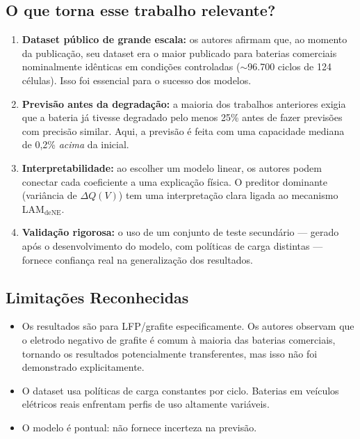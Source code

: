 \documentclass[12pt,a4paper]{article}
\begin{document}
\subsection{O que torna esse trabalho relevante?}

\begin{enumerate}
  \item \textbf{Dataset p\'{u}blico de grande escala:} os autores afirmam que,
    ao momento da publica\c{c}\~ao, seu dataset era o maior publicado para baterias
    comerciais nominalmente id\^{e}nticas em condi\c{c}\~oes controladas ($\sim$96.700
    ciclos de 124 c\'{e}lulas). Isso foi essencial para o sucesso dos modelos.

  \item \textbf{Previs\~ao antes da degrada\c{c}\~ao:} a maioria dos trabalhos anteriores
    exigia que a bateria j\'{a} tivesse degradado pelo menos 25\% antes de fazer
    previs\~oes com precis\~ao similar. Aqui, a previs\~ao \'{e} feita com uma
    capacidade mediana de 0,2\% \textit{acima} da inicial.

  \item \textbf{Interpretabilidade:} ao escolher um modelo linear, os autores
    podem conectar cada coeficiente a uma explica\c{c}\~ao f\'{i}sica. O preditor
    dominante (vari\^{a}ncia de $\Delta Q(V)$) tem uma interpreta\c{c}\~ao clara
    ligada ao mecanismo LAM$_\text{deNE}$.

  \item \textbf{Valida\c{c}\~ao rigorosa:} o uso de um conjunto de teste secund\'{a}rio
    --- gerado ap\'{o}s o desenvolvimento do modelo, com pol\'{i}ticas de carga
    distintas --- fornece confian\c{c}a real na generaliza\c{c}\~ao dos resultados.
\end{enumerate}

\subsection{Limita\c{c}\~oes Reconhecidas}

\begin{itemize}
  \item Os resultados s\~ao para LFP/grafite especificamente. Os autores observam
    que o eletrodo negativo de grafite \'{e} comum \`{a} maioria das baterias comerciais,
    tornando os resultados potencialmente transferentes, mas isso n\~ao foi
    demonstrado explicitamente.
  \item O dataset usa pol\'{i}ticas de carga constantes por ciclo. Baterias em
    ve\'{i}culos el\'{e}tricos reais enfrentam perfis de uso altamente vari\'{a}veis.
  \item O modelo \'{e} pontual: n\~ao fornece incerteza na previs\~ao.
\end{itemize}
\end{document}
